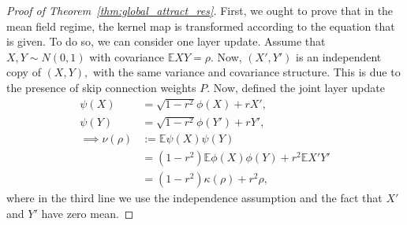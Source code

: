\documentclass[twoside]{article}
\newcommand{\E}{\mathbb{E}}
\theoremstyle{definition}
\begin{document}
\begin{proof}[Proof of Theorem~\ref{thm:global_attract_res}]
First, we ought to prove that in the mean field regime, the kernel map is transformed according to the equation that is given. To do so, we can consider one layer update. Assume that $X,Y\sim N(0,1)$ with covariance $\E XY = \rho.$ Now, $(X',Y')$ is an independent copy of $(X,Y),$ with the same variance and covariance structure. This is due to the presence of skip connection weights $P.$ Now, defined the joint layer update 
\begin{align*}
\psi(X) &= \sqrt{1-r^2} \phi(X)  + r X',\\
\psi(Y) &= \sqrt{1-r^2} \phi(Y')  + r Y',\\
\implies \nu(\rho)&:= \E \psi(X)\psi(Y) \\
&=  (1-r^2) \E \phi(X)\phi(Y) + r^2 \E X' Y' \\
    &= (1-r^2) \kappa(\rho) + r^2 \rho,
\end{align*}
where in the third line we use the independence assumption and the fact that $X'$ and $Y'$ have zero mean. 


\end{proof}
\end{document}
